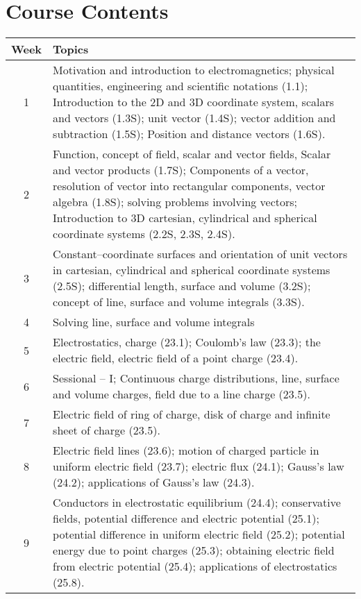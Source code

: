 \documentclass[12pt,a4paper]{article}
\begin{document}
\section{Course Contents}
\begin{center}
\vspace{-0.5cm}
	\begin{longtable}{|c|p{13cm}|}
	\hline \hline
		\rule{0pt}{2.6ex} \textbf{Week} & \textbf{Topics}\\
		\hline
		1 \rule{0pt}{2.6ex} & Motivation and introduction to electromagnetics; physical quantities, engineering and scientific notations (1.1); Introduction to the 2D and 3D coordinate system, scalars and vectors (1.3S); unit vector (1.4S); vector addition and subtraction (1.5S); Position and distance vectors (1.6S).\\
		\hline
		2 \rule{0pt}{2.6ex} & Function, concept of field, scalar and vector fields, Scalar and vector products (1.7S); Components of a vector, resolution of vector into rectangular components, vector algebra (1.8S); solving problems involving vectors; Introduction to 3D cartesian, cylindrical and spherical coordinate systems (2.2S, 2.3S, 2.4S).\\
		\hline
		3 \rule{0pt}{2.6ex} & Constant--coordinate surfaces and orientation of unit vectors in cartesian, cylindrical and spherical coordinate systems (2.5S); differential length, surface and volume (3.2S); concept of line, surface and volume integrals (3.3S).\\
		\hline
		4 \rule{0pt}{2.6ex} & Solving line, surface and volume integrals\\
		\hline
		5 \rule{0pt}{2.6ex} & Electrostatics, charge (23.1); Coulomb's law (23.3); the electric field, electric field of a point charge (23.4).\\
		\hline
		6 \rule{0pt}{2.6ex} & Sessional -- I; Continuous charge distributions, line, surface and volume charges,  field due to a line charge (23.5).\\
		\hline
		7 \rule{0pt}{2.6ex} & Electric field of ring of charge, disk of charge and infinite sheet of charge (23.5).\\
		\hline
		8 \rule{0pt}{2.6ex} & Electric field lines (23.6); motion of charged particle in uniform electric field (23.7); electric flux (24.1); Gauss's law (24.2); applications of Gauss's law (24.3).\\
		\hline
		9 \rule{0pt}{2.6ex} & Conductors in electrostatic equilibrium (24.4); conservative fields, potential difference and electric potential (25.1); potential difference in uniform electric field (25.2); potential energy due to point charges (25.3); obtaining electric field from electric potential (25.4); applications of electrostatics (25.8).\\

\end{longtable}
\end{center}
\end{document}

